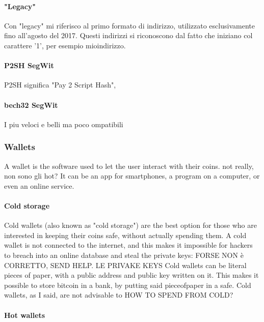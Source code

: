 \documentclass {article}
\begin{document}
\paragraph {"Legacy"}


Con "legacy" mi riferisco al primo formato di indirizzo, utilizzato esclusivamente fino all'agosto del 2017.
Questi indirizzi si riconoscono dal fatto che iniziano col carattere '1', per esempio mioindirizzo.


\paragraph {P2SH SegWit}


P2SH significa "Pay 2 Script Hash", 


\paragraph {bech32 SegWit}


I piu veloci e belli ma poco ompatibili


\subsubsection {Wallets}


A wallet is the software used to let the user interact with their coins. not really, non sono gli hot?
It can be an app for smartphones, a program on a computer, or even an online service.


\paragraph {Cold storage}


Cold wallets (also known as "cold storage") are the best option for those who are interested in keeping their coins safe, without actually spending them.
A cold wallet is not connected to the internet, and this makes it impossible for hackers to breach into an online database and steal the private keys: FORSE NON è CORRETTO, SEND HELP. LE PRIVAKE KEYS 
Cold wallets can be literal pieces of paper, with a public address and public key written on it. This makes it possible to store bitcoin in a bank, by putting said pieceofpaper in a safe.
Cold wallets, as I said, are not advisable to HOW TO SPEND FROM COLD?


\paragraph {Hot wallets}
\end{document}

